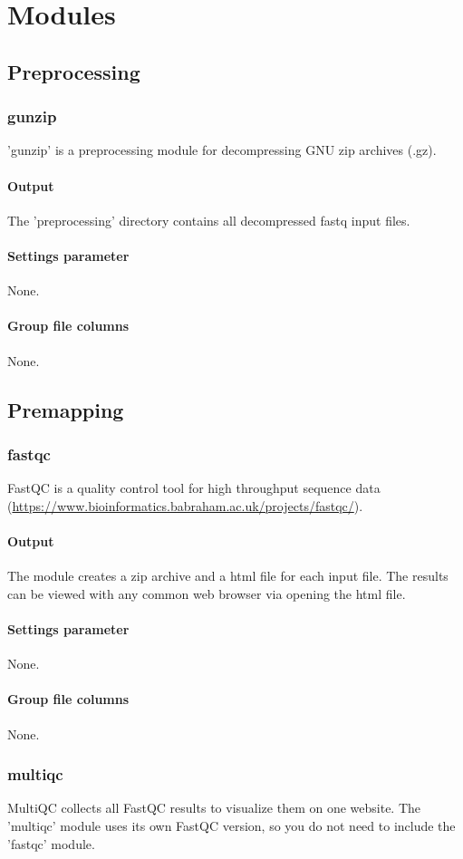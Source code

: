\documentclass[a4paper]{article}
\begin{document}
\section{Modules}
\subsection{Preprocessing}
\subsubsection{gunzip}
'gunzip' is a preprocessing module for decompressing GNU zip archives (.gz).
\paragraph{Output}
The 'preprocessing' directory contains all decompressed fastq input files.
\paragraph{Settings parameter} None.
\paragraph{Group file columns} None.

\subsection{Premapping}
\subsubsection{fastqc}
FastQC is a quality control tool for high throughput sequence data (\url{https://www.bioinformatics.babraham.ac.uk/projects/fastqc/}).
\paragraph{Output}
The module creates a zip archive and a html file for each input file. The results can be viewed with any common web browser via opening the html file.
\paragraph{Settings parameter} None.
\paragraph{Group file columns} None.

\subsubsection{multiqc}
MultiQC collects all FastQC results to visualize them on one website. The 'multiqc' module uses its own FastQC version, so you do not need to include the 'fastqc' module.
\end{document}
